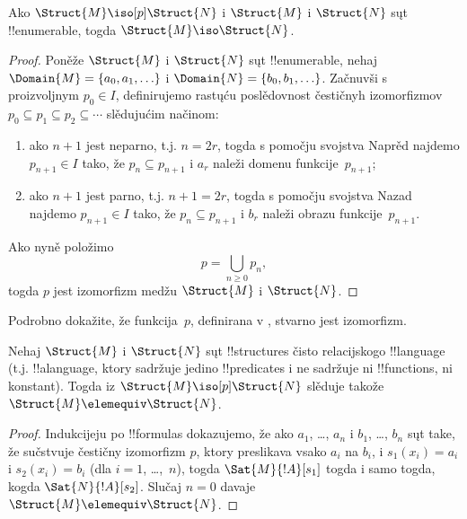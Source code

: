 \documentclass[../../../include/open-logic-section]{subfiles}
\begin{document}
\begin{thm}
  Ako $\Struct{M} \iso[p] \Struct{N}$ i $\Struct{M}$ i
  $\Struct{N}$ sųt !!{enumerable}, togda $\Struct{M} \iso
  \Struct{N}$.
\end{thm}

\begin{proof}
  Poněže $\Struct{M}$ i $\Struct{N}$ sųt !!{enumerable}, nehaj
  $\Domain{M} =
  \{a_0, a_1, \ldots \}$ i
  $\Domain{N} = \{b_0, b_1, \ldots \}$. Začnuvši s proizvoljnym
  $p_0 \in I$, definirujemo rastųću poslědovnost čestičnyh izomorfizmov
  $p_0 \subseteq p_1 \subseteq p_2
  \subseteq \cdots$ slědujućim
  načinom:
  \begin{enumerate}
  \item ako $n+1$ jest neparno, t.j. $n = 2r$, togda s pomočju
    svojstva Naprěd najdemo $p_{n+1} \in I$ tako, že
    $p_n \subseteq p_{n+1}$ i $a_r$ naleži domenu funkcije~$p_{n+1}$;
  \item ako $n+1$ jest parno, t.j. $n+1 =2r$, togda s pomočju
    svojstva Nazad najdemo $p_{n+1} \in I$ tako, že
    $p_n \subseteq p_{n+1}$ i $b_r$ naleži obrazu funkcije~$p_{n+1}$.
  \end{enumerate}
Ako nyně položimo
\[
p = \bigcup_{n\ge 0} p_n,
\]
togda $p$ jest izomorfizm medžu $\Struct{M}$ i $\Struct{N}$.
\end{proof}

\begin{prob}
  Podrobno dokažite, že funkcija~$p$, definirana v
  , stvarno jest izomorfizm.
\end{prob}

\begin{thm}
  Nehaj $\Struct{M}$ i $\Struct{N}$ sųt !!{structure}s čisto
  relacijskogo !!{language} (t.j. !!a{language}, ktory sadržuje jedino
  !!{predicate}s i ne sadržuje ni !!{function}s, ni konstant). Togda
  iz $\Struct{M} \iso[p] \Struct{N}$ slěduje takože
  $\Struct{M} \elemequiv
  \Struct{N}$.
\end{thm}

\begin{proof}
  Indukcijeju po !!{formula}s dokazujemo, že ako $a_1$, \dots, $a_n$ i
  $b_1$, \dots, $b_n$ sųt take, že sučstvuje čestičny izomorfizm $p$,
  ktory preslikava vsako $a_i$ na $b_i$, i $s_1(x_i) =a_i$ i
  $s_2(x_i) =b_i$ (dla $i =1$, \dots,~$n$), togda
  $\Sat{M}{!A}[s_1]$ togda i samo togda, kogda
  $\Sat{N}{!A}[s_2]$. Slučaj $n=0$ davaje
  $\Struct{M} \elemequiv \Struct{N}$.
\end{proof}
\end{document}
